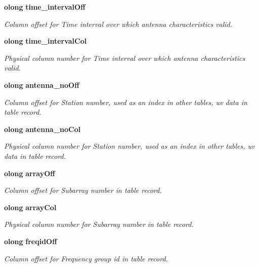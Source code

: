 \begin{CompactItemize}
{\bf olong} {\bf time\_\-interval\-Off}
\begin{CompactList}\small\item\em Column offset for Time interval over which antenna characteristics valid. \item\end{CompactList}\item 
{\bf olong} {\bf time\_\-interval\-Col}
\begin{CompactList}\small\item\em Physical column number for Time interval over which antenna characteristics valid. \item\end{CompactList}\item 
{\bf olong} {\bf antenna\_\-no\-Off}
\begin{CompactList}\small\item\em Column offset for Station number, used as an index in other tables, uv data in table record. \item\end{CompactList}\item 
{\bf olong} {\bf antenna\_\-no\-Col}
\begin{CompactList}\small\item\em Physical column number for Station number, used as an index in other tables, uv data in table record. \item\end{CompactList}\item 
{\bf olong} {\bf array\-Off}
\begin{CompactList}\small\item\em Column offset for Subarray number in table record. \item\end{CompactList}\item 
{\bf olong} {\bf array\-Col}
\begin{CompactList}\small\item\em Physical column number for Subarray number in table record. \item\end{CompactList}\item 
{\bf olong} {\bf freqid\-Off}
\begin{CompactList}\small\item\em Column offset for Frequency group id in table record. \item\end{CompactList}\item 

\end{CompactItemize}
